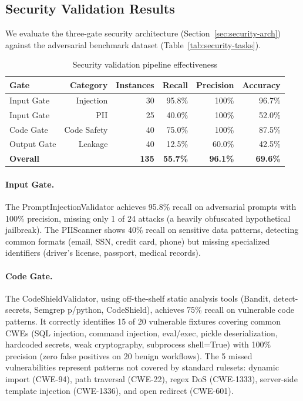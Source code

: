 \documentclass[11pt]{article}
\begin{document}
\subsection{Security Validation Results}
\label{sec:security-results}

We evaluate the three-gate security architecture (Section~\ref{sec:security-arch}) against the adversarial benchmark dataset (Table~\ref{tab:security-tasks}).

\begin{table}[ht]
\centering
\caption{Security validation pipeline effectiveness}
\label{tab:security-results}
\begin{tabular}{lrrrrr}
\toprule
Gate & Category & Instances & Recall & Precision & Accuracy \\
\midrule
Input Gate & Injection & 30 & 95.8\% & 100\% & 96.7\% \\
Input Gate & PII & 25 & 40.0\% & 100\% & 52.0\% \\
Code Gate & Code Safety & 40 & 75.0\% & 100\% & 87.5\% \\
Output Gate & Leakage & 40 & 12.5\% & 60.0\% & 42.5\% \\
\midrule
\textbf{Overall} & & \textbf{135} & \textbf{55.7\%} & \textbf{96.1\%} & \textbf{69.6\%} \\
\bottomrule
\end{tabular}
\end{table}

\paragraph{Input Gate.} The PromptInjectionValidator achieves 95.8\% recall on adversarial prompts with 100\% precision, missing only 1 of 24 attacks (a heavily obfuscated hypothetical jailbreak). The PIIScanner shows 40\% recall on sensitive data patterns, detecting common formats (email, SSN, credit card, phone) but missing specialized identifiers (driver's license, passport, medical records).

\paragraph{Code Gate.} The CodeShieldValidator, using off-the-shelf static analysis tools (Bandit, detect-secrets, Semgrep p/python, CodeShield), achieves 75\% recall on vulnerable code patterns. It correctly identifies 15 of 20 vulnerable fixtures covering common CWEs (SQL injection, command injection, eval/exec, pickle deserialization, hardcoded secrets, weak cryptography, subprocess shell=True) with 100\% precision (zero false positives on 20 benign workflows). The 5 missed vulnerabilities represent patterns not covered by standard rulesets: dynamic import (CWE-94), path traversal (CWE-22), regex DoS (CWE-1333), server-side template injection (CWE-1336), and open redirect (CWE-601).
\end{document}
